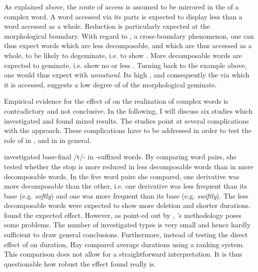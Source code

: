 {As explained above, the route of access is assumed to be mirrored in the  of a complex word. A word accessed via its parts is expected to display less  than a word accessed as a whole. Reduction is particularly expected at the morphological boundary. With regard to , a cross-boundary phenomenon, one can thus expect words which are less decomposable, and which are thus accessed as a whole, to be likely to degeminate, i.e. to show . More decomposable words are expected to geminate, i.e. show no or less . 
Turning back to the example above, one would thus expect  with \textit{unnatural}. Its high , and consequently the  via which it is accessed, suggests a low degree of  of the morphological geminate.


Empirical evidence for the effect of  on the realization of complex words is contradictory and not conclusive. In the following, I will discuss six studies which investigated  and found mixed results. The studies point at several complications with the approach. These complications have to be addressed in order to test the role of  in , and in  in general. 

 \cite{Hay.2003} investigated  base-final /t/- in -suffixed words. By comparing word pairs, she tested whether the stop is more reduced in less decomposable words than in more decomposable words. In the five word pairs she compared, one derivative was more decomposable than the other, i.e. one derivative was less frequent than its base (e.g. \textit{softly}) and one was more frequent than its base (e.g. \textit{swiftly}). The less decomposable words were expected to show more deletion and shorter durations.  \citeauthor{Hay.2003} found the expected effect. 
 However, as point-ed out by \cite{Hanique.2012}, \citeauthor{Hay.2003}'s methodology poses some problems. The number of investigated types is very small and hence hardly sufficient to draw general conclusions. Furthermore, instead of testing the direct effect of  on duration, Hay compared average durations using a ranking system. This comparison does not allow for a straightforward interpretation. It is thus questionable how robust the effect found really is.

}
